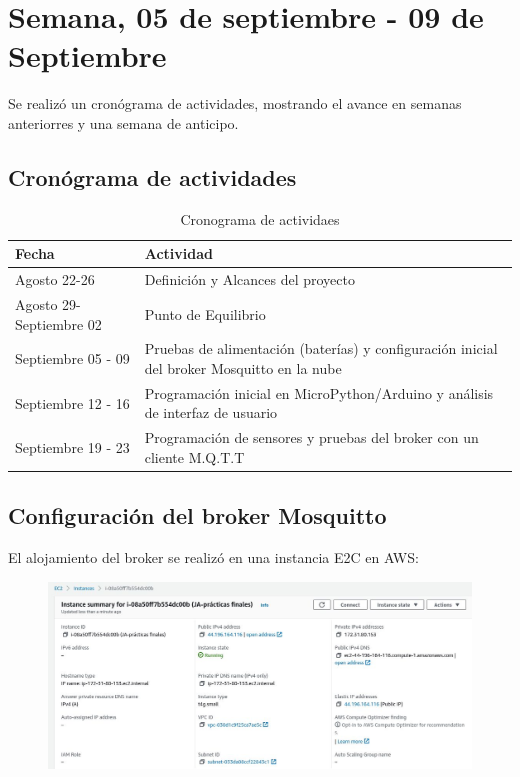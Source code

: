 \documentclass[oneside]{article}
\begin{document}
\newpage
\section*{Semana, 05 de septiembre - 09 de Septiembre}
Se realizó un cronógrama de actividades, mostrando el avance en semanas anteriorres y una semana de anticipo.  
\subsection*{Cronógrama de actividades}

\begin{table}[H]
\begin{longtable}[c]{p{5cm} p{9cm}}
\toprule
Fecha & Actividad \\
\midrule
Agosto 22-26 & Definición y Alcances del proyecto \\
\hline
Agosto 29- Septiembre 02 & Punto de Equilibrio \\
\hline
Septiembre 05 - 09 & Pruebas de alimentación (baterías) y configuración inicial del broker Mosquitto en la nube\\
\hline
Septiembre 12 - 16 & Programación inicial en MicroPython/Arduino y análisis de interfaz de usuario \\ 
\hline 
Septiembre 19 - 23 & Programación de sensores y pruebas del broker con un cliente M.Q.T.T \\
\hline

\end{longtable}
\caption*{Cronograma de actividaes}
\end{table}

\subsection*{Configuración del broker Mosquitto}
El alojamiento del broker se realizó en una instancia E2C en AWS:
\begin{figure}[H]
\centering
\includegraphics[scale=0.6]{images/broker_aws.jpg}
\end{figure}
 
\end{document}
